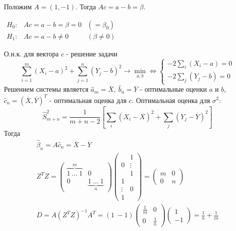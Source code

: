 \begin{example}
Положим $A=(1, -1)$. Тогда $Ac=a-b=\beta$.

$\begin{array}{ccc}
    H_0:& Ac=a-b=\beta=0& (=\beta_0)\\
    H_1:& Ac=a-b\neq0& (\beta\neq0)
\end{array}$

О.н.к. для вектора $c$ - решение задачи
\[
    \sum_{i=1}^m(X_i-a)^2+\sum_{j=1}^n(Y_j-b)^2\rightarrow \min_{a, b}
    \Leftrightarrow \begin{cases}
        -2\sum_i(X_i-a) = 0 \\
        -2\sum_j(Y_j-b) = 0
    \end{cases}
\]
Решением системы является $\widehat{a}_m=\overline{X},\ \widehat{b}_n=\overline{Y}$ -
оптимальные оценки $a$ и $b$, $\widehat{c}_n=(\overline{X}, \overline{Y})^T$ - оптимальная
оценка для $c$. Оптимальная оценка для $\sigma^2$:
\[ \widehat{S}^2_{m+n}=\frac{1}{m+n-2}\left[\sum_i(X_i-\overline{X})^2+\sum_j(Y_j-\overline{Y})^2\right] \]
Тогда
\[
\begin{array}{l}
    \widehat{\beta}_n=A\widehat{c}_n=\overline{X}-\overline{Y} \\
    Z^TZ=\left(\begin{array}{cc}
        \overbrace{1\ \ldots\ 1}^m & 0 \\
                0      & \underbrace{1\ \ldots\ 1}_n
    \end{array}\right)
    \left(\begin{array}{cc}
            & 1 \\
        0 & \vdots \\
            & 1 \\
        1  & \\
        \vdots & 0 \\
        1  &
    \end{array}\right) = \left(\begin{array}{cc}
        m & 0 \\
        0 & n
    \end{array}\right) \\
    D=A(Z^TZ)^{-1}A^T=
    \left(1\ -1 \right)
    \left(\begin{array}{cc}
        \frac{1}{m} & 0 \\
        0 & \frac{1}{n}
    \end{array}\right)
    \left(\begin{array}{c}
        1 \\
        -1
    \end{array}\right) = \frac{1}{n} + \frac{1}{m}

\end{array}\]
\end{example}
